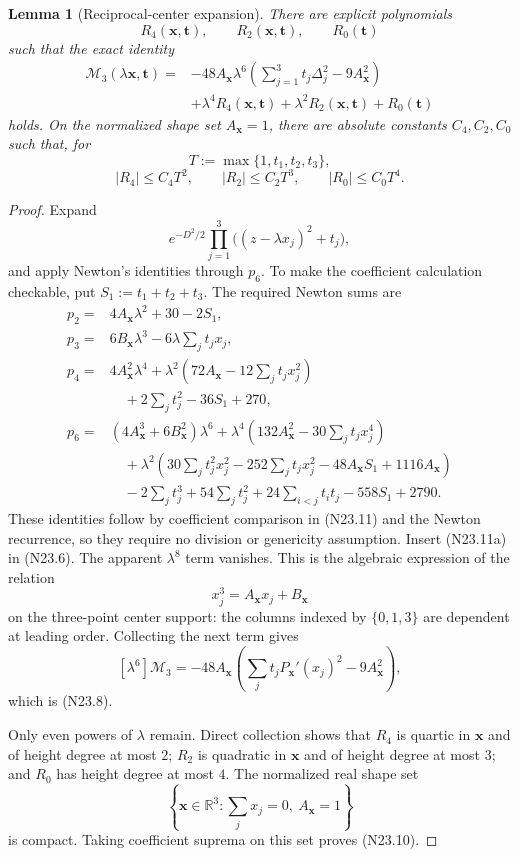 \documentclass[11pt]{article}
\newtheorem{lemma}[theorem]{Lemma}
\theoremstyle{definition}
\theoremstyle{remark}
\begin{document}
\begin{lemma}[Reciprocal-center expansion]
\label{lem:f2v23-leading}
There are explicit polynomials
\[
 R_4(\bm x,\bm t),\qquad
 R_2(\bm x,\bm t),\qquad
 R_0(\bm t)
 \tag{N23.7}
\]
such that the exact identity
\[
\begin{aligned}
 \mathcal M_3(\lambda\bm x,\bm t)
={}&-48A_{\bm x}\lambda^6
 \left(\sum_{j=1}^3t_j\Delta_j^2-9A_{\bm x}^2\right)\\
 &+\lambda^4R_4(\bm x,\bm t)
  +\lambda^2R_2(\bm x,\bm t)+R_0(\bm t)
\end{aligned}
\tag{N23.8}
\]
holds.  On the normalized shape set \(A_{\bm x}=1\), there are absolute
constants \(C_4,C_2,C_0\) such that, for
\[
 T:=\max\{1,t_1,t_2,t_3\},
 \tag{N23.9}
\]
\[
 |R_4|\leq C_4T^2,\qquad
 |R_2|\leq C_2T^3,\qquad
 |R_0|\leq C_0T^4.
 \tag{N23.10}
\]
\end{lemma}

\begin{proof}
Expand
\[
 e^{-D^2/2}\prod_{j=1}^3
 \bigl((z-\lambda x_j)^2+t_j\bigr),
 \tag{N23.11}
\]
and apply Newton's identities through \(p_6\).  To make the coefficient
calculation checkable, put \(S_1:=t_1+t_2+t_3\).  The required Newton
sums are
\[
\begin{aligned}
p_2={}&4A_{\bm x}\lambda^2+30-2S_1,\\
p_3={}&6B_{\bm x}\lambda^3-6\lambda\sum_jt_jx_j,\\
p_4={}&4A_{\bm x}^2\lambda^4
 +\lambda^2\left(72A_{\bm x}-12\sum_jt_jx_j^2\right)\\
&\quad+2\sum_jt_j^2-36S_1+270,\\
p_6={}&(4A_{\bm x}^3+6B_{\bm x}^2)\lambda^6
 +\lambda^4\left(132A_{\bm x}^2-30\sum_jt_jx_j^4\right)\\
&\quad+\lambda^2\left(30\sum_jt_j^2x_j^2
 -252\sum_jt_jx_j^2-48A_{\bm x}S_1+1116A_{\bm x}\right)\\
&\quad-2\sum_jt_j^3+54\sum_jt_j^2
 +24\sum_{i<j}t_it_j-558S_1+2790.
\end{aligned}
\tag{N23.11a}
\]
These identities follow by coefficient comparison in \textup{(N23.11)}
and the Newton recurrence, so they require no division or genericity
assumption.  Insert \textup{(N23.11a)} in \textup{(N23.6)}.  The
apparent \(\lambda^8\) term vanishes.  This is the algebraic expression
of the relation
\[
 x_j^3=A_{\bm x}x_j+B_{\bm x}
 \tag{N23.12}
\]
on the three-point center support: the columns indexed by
\(\{0,1,3\}\) are dependent at leading order.  Collecting the next term
gives
\[
 [\lambda^6]\mathcal M_3
 =-48A_{\bm x}
   \left(\sum_jt_jP_{\bm x}'(x_j)^2-9A_{\bm x}^2\right),
 \tag{N23.13}
\]
which is \textup{(N23.8)}.

Only even powers of \(\lambda\) remain.  Direct collection shows that
\(R_4\) is quartic in \(\bm x\) and of height degree at most \(2\);
\(R_2\) is quadratic in \(\bm x\) and of height degree at most \(3\);
and \(R_0\) has height degree at most \(4\).  The normalized real shape
set
\[
 \left\{\bm x\in\mathbb R^3:
 \sum_jx_j=0,\ A_{\bm x}=1\right\}
 \tag{N23.14}
\]
is compact.  Taking coefficient suprema on this set proves
\textup{(N23.10)}.
\end{proof}
\end{document}

